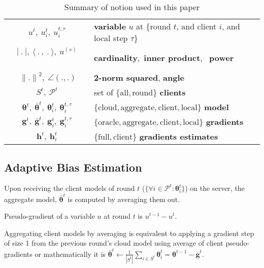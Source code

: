 \documentclass[runningheads]{llncs}
\def\vtheta{{\bm{\theta}}}
\def\vg{{\bm{g}}}
\def\vh{{\bm{h}}}
\def\gP{{\mathcal{P}}}
\begin{document}
\begin{table}
\caption{Summary of notion used in this paper}
\label{tb:notation}
    \begin{center}
\begin{tabular}{cl}
        \toprule
        $u^t, \ u_i^t, \ u_i^{t,\tau}$ & \textbf{variable} $u$ at \{round $t$, and {client} $i$, and {local step} $\tau$\} \\
        $|\ . \ |, \ \langle \ . \ , \ . \ \rangle, \ u^{(v)}$ \ \ \ \ \ \ &  \textbf{cardinality},\  \textbf{inner product}, \ \textbf{power}\\
        $\ {\| . \|}^2, \ \angle(. , .)$ & \textbf{2-norm squared}, \textbf{angle} \\
        $S^t, \ \gP^t$ & set of $\{{\text{all}},\text{round}\}$ \textbf{clients}\\
        $\vtheta^t,\  \bar{\vtheta}^t, \ \vtheta_i^t,\ \vtheta_i^{t,\tau}$ & $\{\text{cloud},\text{aggregate},\text{client},\text{local}\}$ \textbf{model}\\
        $\vg^t, \ \bar{\vg}^t,  \ \vg_i^t, \ \vg_i^{t,\tau}$ & $\{\text{oracle},\text{aggregate},\text{client},\text{local}\}$ \textbf{gradients}\\
        $\vh^t, \ \vh_i^t$ & $\{\text{full},\text{client}\}$ \textbf{gradients estimates}\\
        \bottomrule
    \end{tabular}
\end{center}
\end{table} 

\subsection{Adaptive Bias Estimation} 
Upon receiving the client models of round $t$ ($\{\forall i \in \gP^t: \vtheta_i^t\}$) on the server, the {aggregate model}, $\bar{\vtheta}^t$ is computed by averaging them out. 

{ Pseudo-gradient of a variable $u$ at round $t$ is $u^{t-1}-u^{t}$.} 

\begin{remark}
\label{re:aggregate}
Aggregating client models by averaging is equivalent to applying a gradient step of size 1 from the previous round's cloud model using average of client pseudo-gradients or mathematically it is $\bar{\vtheta}^t \leftarrow \frac{1}{|S^t|} \sum_{i\in S^t} \vtheta_i^t = \vtheta^{t-1} - \bar{\vg}^t$.
\end{remark}
\end{document}
